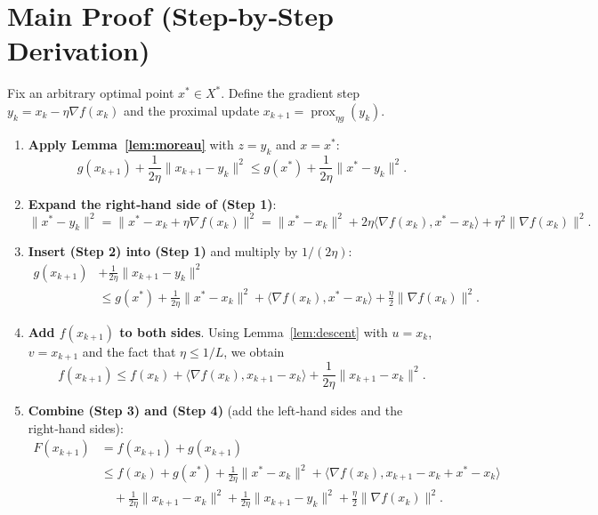 \documentclass{article}
\begin{document}
\section*{Main Proof (Step‑by‑Step Derivation)}
Fix an arbitrary optimal point $x^{*}\in X^{*}$.  
Define the gradient step $y_{k}=x_{k}-\eta\nabla f(x_{k})$ and the proximal update $x_{k+1}=\operatorname{prox}_{\eta g}(y_{k})$.

\begin{enumerate}
\item \textbf{Apply Lemma~\ref{lem:moreau}} with $z=y_{k}$ and $x=x^{*}$:
\[
g(x_{k+1})+\frac{1}{2\eta}\|x_{k+1}-y_{k}\|^{2}
\le g(x^{*})+\frac{1}{2\eta}\|x^{*}-y_{k}\|^{2}.
\tag{Step 1}
\]

\item \textbf{Expand the right‑hand side of (Step 1)}:
\[
\|x^{*}-y_{k}\|^{2}
=\|x^{*}-x_{k}+\eta\nabla f(x_{k})\|^{2}
= \|x^{*}-x_{k}\|^{2}+2\eta\langle\nabla f(x_{k}),x^{*}-x_{k}\rangle+\eta^{2}\|\nabla f(x_{k})\|^{2}.
\tag{Step 2}
\]

\item \textbf{Insert (Step 2) into (Step 1)} and multiply by $1/(2\eta)$:
\[
\begin{aligned}
g(x_{k+1}) &+ \frac{1}{2\eta}\|x_{k+1}-y_{k}\|^{2}
\\
&\le g(x^{*})+\frac{1}{2\eta}\|x^{*}-x_{k}\|^{2}
+ \langle\nabla f(x_{k}),x^{*}-x_{k}\rangle
+\frac{\eta}{2}\|\nabla f(x_{k})\|^{2}.
\end{aligned}
\tag{Step 3}
\]

\item \textbf{Add $f(x_{k+1})$ to both sides}.  
Using Lemma~\ref{lem:descent} with $u=x_{k}$, $v=x_{k+1}$ and the fact that $\eta\le 1/L$, we obtain
\[
f(x_{k+1})\le f(x_{k})+\langle\nabla f(x_{k}),x_{k+1}-x_{k}\rangle+\frac{1}{2\eta}\|x_{k+1}-x_{k}\|^{2}.
\tag{Step 4}
\]

\item \textbf{Combine (Step 3) and (Step 4)} (add the left‑hand sides and the right‑hand sides):
\[
\begin{aligned}
F(x_{k+1}) 
&= f(x_{k+1})+g(x_{k+1})\\
&\le f(x_{k})+g(x^{*})+\frac{1}{2\eta}\|x^{*}-x_{k}\|^{2}
+\langle\nabla f(x_{k}),x_{k+1}-x_{k}+x^{*}-x_{k}\rangle\\
&\quad+\frac{1}{2\eta}\|x_{k+1}-x_{k}\|^{2}
+\frac{1}{2\eta}\|x_{k+1}-y_{k}\|^{2}
+\frac{\eta}{2}\|\nabla f(x_{k})\|^{2}.
\end{aligned}
\tag{Step 5}
\]


\end{enumerate}
\end{document}
